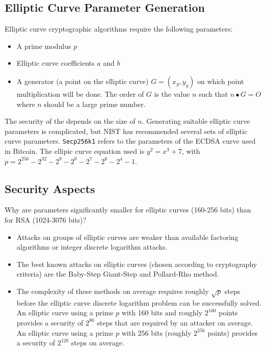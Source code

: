 \documentclass{math}
\begin{document}
\subsection*{Elliptic Curve Parameter Generation}
Elliptic curve cryptographic algorithms require the following parameters:
\begin{itemize}
  \item A prime modulus \( p \)
  \item Elliptic curve coefficients \( a \) and \( b \)
  \item A generator (a point on the elliptic curve) \( G = (x_g,y_g) \) on
  which point multiplication will be done. The order of \( G \) is the value
  \( n \) such that \( n\bullet G = O \) where \( n \) should be a large prime
  number.
\end{itemize}
The security of the depends on the size of \( n \). Generating suitable elliptic
curve parameters is complicated, but NIST has recommended several sets of
elliptic curve parameters. \texttt{Secp256k1} refers to the parameters of the
ECDSA curve used in Bitcoin. The ellipic curve equation used is \( y^2 = x^3+7
\), with \( p = 2^{256}-2^{32}-2^9-2^8-2^7-2^6-2^4-1 \).

\subsection*{Security Aspects}
Why are parameters significantly smaller for elliptic curves (160-256 bits) than
for RSA (1024-3076 bits)?
\begin{itemize}
  \item Attacks on groups of elliptic curves are weaker than available factoring
  algorithms or integer discrete logarithm attacks.
  \item The best known attacks on elliptic curves (chosen according to
  cryptography criteria) are the Baby-Step Giant-Step and Pollard-Rho method.
  \item The complexity of these methods on average requires roughly \( \sqrt{p}
  \) steps before the elliptic curve discrete logarithm problem can be
  successfully solved. An elliptic curve using a prime \( p \) with 160 bits
  and roughly \( 2^{160} \) points provides a security of \( 2^{80} \) steps
  that are required by an attacker on average. An elliptic curve using a prime
  \( p \) with 256 bits (roughly \( 2^{256} \) points) provides a security of
  \( 2^{128} \) steps on average.
\end{itemize}
\end{document}
